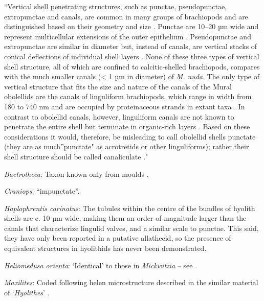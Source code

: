 \documentclass[openany]{book}
\begin{document}
``Vertical shell penetrating structures, such as punctae, pseudopunctae,
extropunctae and canals, are common in many groups of brachiopods and
are distinguished based on their geometry and size
\citep{Williams1997Introduction}. Punctae are 10--20 µm wide and
represent multicellular extensions of the outer epithelium
\citep{Owen1969Thecaecum}. Pseudopunctae and extropunctae are similar in
diameter but, instead of canals, are vertical stacks of conical
deflections of individual shell layers \citep{Williams1993Roleof}. None
of these three types of vertical shell structure, all of which are
confined to calcitic-shelled brachiopods, compares with the much smaller
canals (\textless{} 1 µm in diameter) of \emph{M. nuda}. The only type
of vertical structure that fits the size and nature of the canals of the
Mural obolellids are the canals of linguliform brachiopods, which range
in width from 180 to 740 nm and are occupied by proteinaceous strands in
extant taxa
\citep{Williams1992Structureof, Williams1994Collagenouschitino, Williams1997Introduction}.
In contrast to obolellid canals, however, linguliform canals are not
known to penetrate the entire shell but terminate in organic-rich layers
\citep{Williams1997Introduction}. Based on these considerations it
would, therefore, be misleading to call obolellid shells punctate (they
are as much''punctate" as acrotretids or other linguliforms); rather
their shell structure should be called canaliculate
\citep{Williams1997Introduction}."

\hypertarget{Bactrotheca-coding-138}{}
\emph{Bactrotheca}: Taxon known only from moulds \citep{Valent2012}.

\hypertarget{Craniops-coding-138}{}
\emph{Craniops}: ``impunctate''.

\hypertarget{Haplophrentis_carinatus-coding-138}{}
\emph{Haplophrentis carinatus}: The tubules within the centre of the
bundles of hyolith shells \citep{Kouchinsky2000Skeletalmicrostructures}
are c. 10 µm wide, making them an order of magnitude larger than the
canals that characterize lingulid valves, and a similar scale to
punctae. This said, they have only been reported in a putative
allathecid, so the presence of equivalent structures in hyolithids has
never been demonstrated.

\hypertarget{Heliomedusa_orienta-coding-138}{}
\emph{Heliomedusa orienta}: `Identical' to those in \emph{Mickwitzia} --
see \citet{Williams2007Supplement}.

\hypertarget{Maxilites-coding-138}{}
\emph{Maxilites}: Coded following helen microstructure described in the
similar material of `\emph{Hyolithes}' \citep{MartiMus2007}.
\end{document}
